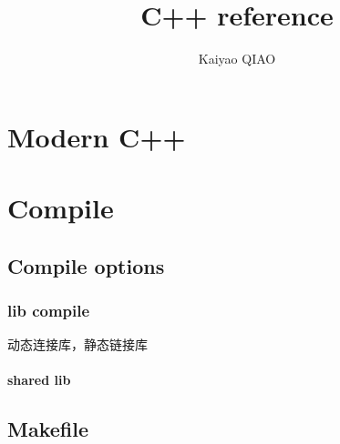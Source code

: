 \documentclass[12pt,UTF8]{book}
\begin{document}
\title{C++ reference}
\author{Kaiyao QIAO}

\maketitle
\chapter{Modern C++}

\chapter{Compile}
\section{Compile options}
\subsection{lib compile}
动态连接库，静态链接库
\subsubsection{shared lib}



\section{Makefile}



\medskip

%
%
\end{document}
